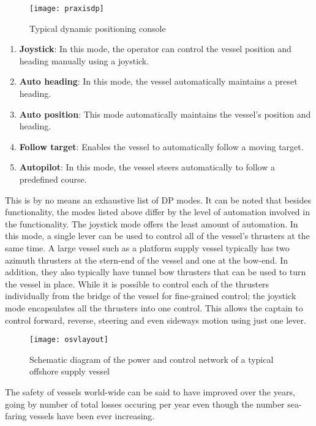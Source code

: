 \begin{figure}
	\centering
	\texttt{[image: praxisdp]}
	\caption{Typical dynamic positioning console}
	\label{fig:praxisdp}
\end{figure}

\begin{enumerate}

\item \textbf{Joystick}: In this mode, the operator can control the vessel position and heading manually using a joystick. 
\item \textbf{Auto heading}: In this mode, the vessel automatically maintains a preset heading. 
\item \textbf{Auto position}: This mode automatically maintains the vessel's position and heading. 
\item \textbf{Follow target}: Enables the vessel to automatically follow a moving target. 
\item \textbf{Autopilot}: In this mode, the vessel steers automatically to follow a predefined course. 

\end{enumerate}

This is by no means an exhaustive list of DP modes. It can be noted that besides functionality, the modes listed above differ by the level of automation involved in the functionality.  The joystick mode offers the least amount of automation. In this mode, a single lever can be used to control all of the vessel's thrusters at the same time. A large vessel such as a platform supply vessel typically has two azimuth thrusters at the stern-end of the vessel and one at the bow-end. In addition, they also typically have tunnel bow thrusters that can be used to turn the vessel in place. While it is possible to control each of the thrusters individually from the bridge of the vessel for fine-grained control; the joystick mode encapsulates all the thrusters into one control. This allows the captain to control forward, reverse, steering and even sideways motion using just one lever.


\begin{figure}
	\centering
	\texttt{[image: osvlayout]}
	\caption{Schematic diagram of the power and control network of a typical offshore supply vessel}
	\label{fig:osvlayout}
\end{figure}

The safety of vessels world-wide can be said to have improved over the years, going by number of total losses occuring per year even though the number sea-faring vessels have been ever increasing. 